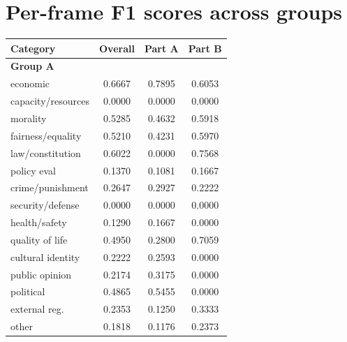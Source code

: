 \documentclass[
10pt, %
a4paper, %
oneside, %
headinclude,footinclude, %
] {book}%
\begin{document}
\section{Per-frame F1 scores across groups}
\begin{table}[htbp]
\centering
\scriptsize
\setlength{\tabcolsep}{4pt}
\begin{tabular}{lccc}
\toprule
\textbf{Category} & \textbf{Overall} & \textbf{Part A} & \textbf{Part B} \\
\midrule

\multicolumn{4}{l}{\textbf{Group A}} \\
economic & 0.6667 & 0.7895 & 0.6053 \\
capacity/resources & 0.0000 & 0.0000 & 0.0000 \\
morality & 0.5285 & 0.4632 & 0.5918 \\
fairness/equality & 0.5210 & 0.4231 & 0.5970 \\
law/constitution & 0.6022 & 0.0000 & 0.7568 \\
policy eval & 0.1370 & 0.1081 & 0.1667 \\
crime/punishment & 0.2647 & 0.2927 & 0.2222 \\
security/defense & 0.0000 & 0.0000 & 0.0000 \\
health/safety & 0.1290 & 0.1667 & 0.0000 \\
quality of life & 0.4950 & 0.2800 & 0.7059 \\
cultural identity & 0.2222 & 0.2593 & 0.0000 \\
public opinion & 0.2174 & 0.3175 & 0.0000 \\
political & 0.4865 & 0.5455 & 0.0000 \\
external reg. & 0.2353 & 0.1250 & 0.3333 \\
other & 0.1818 & 0.1176 & 0.2373 \\
\midrule


\end{tabular}
\end{table}
\end{document}
